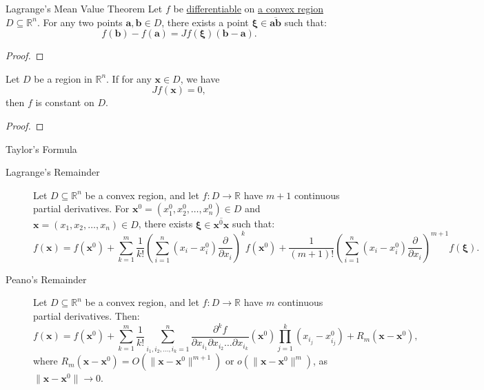 \documentclass[11pt]{../../TexTemplate/elegantbook}
\begin{document}
\begin{theorem}{Lagrange's Mean Value Theorem}\label{thm:Multi_Lagrange}
    Let \(f\) be \underline{differentiable} on \underline{a convex region} \(D \subseteq \mathbb{R}^n\). 
    For any two points \(\mathbf{a}, \mathbf{b} \in D\), 
    there exists a point \(\mathbf{\xi}\in \overline{\mathbf{a} \mathbf{b}}\)
    such that:  
    \[
    f(\mathbf{b}) - f(\mathbf{a}) = Jf(\mathbf{\xi})(\mathbf{b} - \mathbf{a}).
    \]
\end{theorem}

\begin{proof}
    
\end{proof}

\begin{theorem}
    Let \(D\) be a region in \(\mathbb{R}^n\). If for any \(\mathbf{x} \in D\), we have  
    \[
    Jf(\mathbf{x}) = 0,
    \]
    then \(f\) is constant on \(D\).
\end{theorem}

\begin{proof}
    
\end{proof}

\begin{theorem}{Taylor's Formula}
    \begin{description}
        \item[Lagrange's Remainder]  Let \(D \subseteq \mathbb{R}^n\) be a convex region, 
            and let \(f: D \to \mathbb{R}\) have \(m+1\) continuous partial derivatives. 
            For \(\mathbf{x}^0 = (x_1^0, x_2^0, \dots, x_n^0) \in D\) and \(\mathbf{x} = (x_1, x_2, \dots, x_n) \in D\), 
            there exists \(\mathbf{\xi} \in \overline{\mathbf{x}^0 \mathbf{x}}\) such that:  
            \[
            f(\mathbf{x}) = f(\mathbf{x}^0) 
            + \sum_{k=1}^m \frac{1}{k!} \left( \sum_{i=1}^n (x_i - x_i^0) \frac{\partial}{\partial x_i} \right)^k f(\mathbf{x}^0) 
            + \frac{1}{(m+1)!} \left( \sum_{i=1}^n (x_i - x_i^0) \frac{\partial}{\partial x_i} \right)^{m+1} f(\mathbf{\xi}).
            \]
        \item[Peano's Remainder] Let \(D \subseteq \mathbb{R}^n\) be a convex region, 
            and let \(f: D \to \mathbb{R}\) have \(m\) continuous partial derivatives. 
            Then:
            \[
            f(\mathbf{x}) = f(\mathbf{x}^0) 
            + \sum_{k=1}^m \frac{1}{k!} \sum_{i_1, i_2, \dots, i_k=1}^n 
            \frac{\partial^k f}{\partial x_{i_1} \partial x_{i_2} \dots \partial x_{i_k}}(\mathbf{x}^0) 
            \prod_{j=1}^{k} (x_{i_j} - x_{i_j}^0) 
            + R_m(\mathbf{x} - \mathbf{x}^0),
            \]
            where \(R_m(\mathbf{x} - \mathbf{x}^0) = O(\|\mathbf{x} - \mathbf{x}^0\|^{m+1})\) or \(o(\|\mathbf{x} - \mathbf{x}^0\|^{m})\), as \(\|\mathbf{x} - \mathbf{x}^0\| \to 0\).

    \end{description}
\end{theorem}
\end{document}
